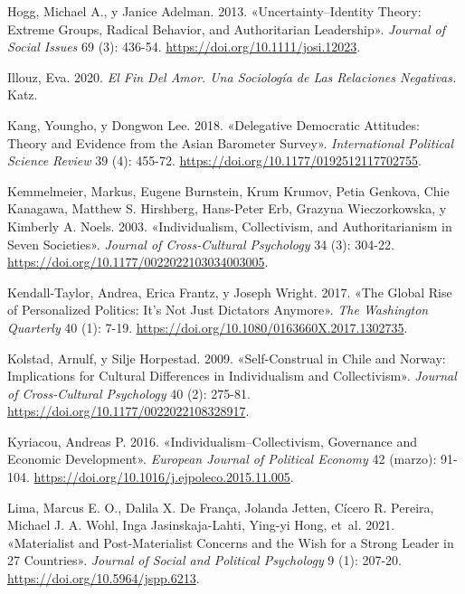 \documentclass[
  letterpaper,
  DIV=11,
  numbers=noendperiod]{scrartcl}
\newlength{\cslhangindent}
\newenvironment{CSLReferences}[2] %
 {\begin{list}{}{%
  \setlength{\itemindent}{0pt}
  \setlength{\leftmargin}{0pt}
  \setlength{\parsep}{0pt}
  \ifodd #1
   \setlength{\leftmargin}{\cslhangindent}
   \setlength{\itemindent}{-1\cslhangindent}
  \fi
  \setlength{\itemsep}{#2\baselineskip}}}
 {\end{list}}
\begin{document}
\begin{CSLReferences}{1}{0}
Hogg, Michael A., y Janice Adelman. 2013. {«Uncertainty--{Identity
Theory}: {Extreme Groups}, {Radical Behavior}, and {Authoritarian
Leadership}»}. \emph{Journal of Social Issues} 69 (3): 436-54.
\url{https://doi.org/10.1111/josi.12023}.

Illouz, Eva. 2020. \emph{El Fin Del Amor. {Una} Sociolog{í}a de Las
Relaciones Negativas.} Katz.

Kang, Youngho, y Dongwon Lee. 2018. {«Delegative Democratic Attitudes:
{Theory} and Evidence from the {Asian} Barometer Survey»}.
\emph{International Political Science Review} 39 (4): 455-72.
\url{https://doi.org/10.1177/0192512117702755}.

Kemmelmeier, Markus, Eugene Burnstein, Krum Krumov, Petia Genkova, Chie
Kanagawa, Matthew S. Hirshberg, Hans-Peter Erb, Grazyna Wieczorkowska, y
Kimberly A. Noels. 2003. {«Individualism, {Collectivism}, and
{Authoritarianism} in {Seven Societies}»}. \emph{Journal of
Cross-Cultural Psychology} 34 (3): 304-22.
\url{https://doi.org/10.1177/0022022103034003005}.

Kendall-Taylor, Andrea, Erica Frantz, y Joseph Wright. 2017. {«The
{Global Rise} of {Personalized Politics}: {It}'s {Not Just Dictators
Anymore}»}. \emph{The Washington Quarterly} 40 (1): 7-19.
\url{https://doi.org/10.1080/0163660X.2017.1302735}.

Kolstad, Arnulf, y Silje Horpestad. 2009. {«Self-{Construal} in {Chile}
and {Norway}: {Implications} for {Cultural Differences} in
{Individualism} and {Collectivism}»}. \emph{Journal of Cross-Cultural
Psychology} 40 (2): 275-81.
\url{https://doi.org/10.1177/0022022108328917}.

Kyriacou, Andreas P. 2016. {«Individualism--Collectivism, Governance and
Economic Development»}. \emph{European Journal of Political Economy} 42
(marzo): 91-104. \url{https://doi.org/10.1016/j.ejpoleco.2015.11.005}.

Lima, Marcus E. O., Dalila X. De França, Jolanda Jetten, Cícero R.
Pereira, Michael J. A. Wohl, Inga Jasinskaja-Lahti, Ying-yi Hong, et~al.
2021. {«Materialist and Post-Materialist Concerns and the Wish for a
Strong Leader in 27 Countries»}. \emph{Journal of Social and Political
Psychology} 9 (1): 207-20. \url{https://doi.org/10.5964/jspp.6213}.


\end{CSLReferences}
\end{document}
